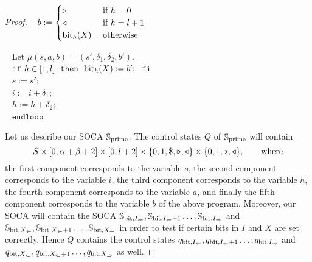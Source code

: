 \documentclass[times,envcountsame]{llncs}
\newcommand{\Soca}{\mathbb{S}}
\begin{document}
\begin{proof}
\ \hspace{3cm} $b:=\begin{cases} \triangleright& \text{ if }h=0\\
\triangleleft &\text{ if }h=l+1\\
\text{bit}_{h}(X) &\text{ otherwise }
\end{cases}$




\ \hspace{3cm} Let $\mu(s,a,b)=(s',\delta_1,\delta_2,b')$.\\[-0.4cm]

\ \hspace{3cm} $\mathtt{if}\ h\in[1,l]\ \ \mathtt{then}\  \ \bit_h(X):=b';\ \ \mathtt{fi}$\\[-0.4cm]

\ \hspace{3cm} $s:=s '$;\\[-0.4cm]


\ \hspace{3cm} $i:=i+\delta_1$;\\[-0.4cm]

\ \hspace{3cm} $h:=h+\delta_2$;\\[-0.4cm]

\ \hspace{2cm} $\mathtt{end loop}$\\[-0.2cm]

\newcommand{\inpu}{\text{input}}
\newcommand{\inz}{\text{input}_0}
\newcommand{\ino}{\text{input}_1}
\newcommand{\work}{\text{work}}
\newcommand{\workz}{\text{work}_0}
\newcommand{\worko}{\text{work}_1}


\noindent
Let us describe our SOCA $\Soca_\prim$.
The control states $Q$ of $\Soca_\prim$ will contain
$$
S\times[0,\alpha+\beta+2]\times[0,l+2]\times
\{0,1,\$,\triangleright,\triangleleft\}\times\{0,1,\triangleright,\triangleleft\}, \qquad\text{where}
$$
the first component corresponds to the variable $s$,
the second component corresponds to the variable $i$,
the third component corresponds to the variable $h$,
the fourth component corresponds to the variable $a$, and
finally the fifth component corresponds to the variable $b$
of the above program.
Moreover, our SOCA will contain
the SOCA $\Soca_{\bit,I_\Li},\Soca_{\bit,I_\Li+1}\ldots,\Soca_{\bit,I_\Re}$ and
$\Soca_{\bit,X_\Li},\Soca_{\bit,X_\Li+1}\ldots,\Soca_{\bit,X_\Re}$ in order to test if
certain bits
in $I$ and $X$ are set correctly.
Hence $Q$ contains the control states
$q_{\text{bit},I_\Leftarrow},q_{\text{bit},I_\Leftarrow+1}\ldots,q_{\text{bit},I_\Rightarrow}$ and
$q_{\text{bit},X_\Leftarrow},q_{\text{bit},X_\Leftarrow+1}\ldots,q_{\text{bit},X_\Rightarrow}$ as well.


\end{proof}
\end{document}
